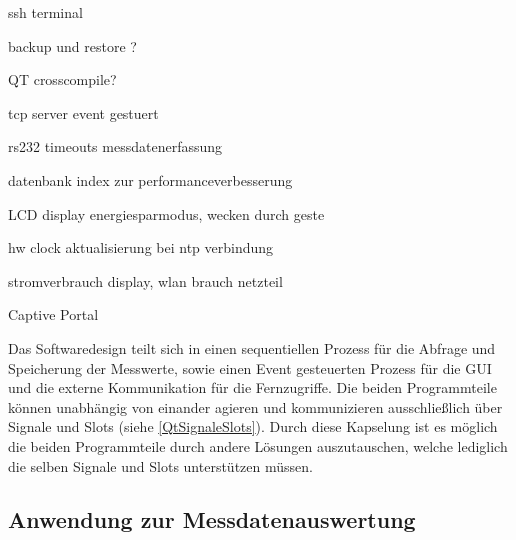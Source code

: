 ssh terminal




backup und restore ?

QT crosscompile?

tcp server event gestuert

rs232 timeouts messdatenerfassung

datenbank index zur performanceverbesserung

LCD display energiesparmodus, wecken durch geste


hw clock aktualisierung bei ntp verbindung


stromverbrauch display, wlan brauch netzteil

Captive Portal

Das Softwaredesign teilt sich in einen sequentiellen Prozess für die Abfrage und Speicherung der Messwerte, sowie einen Event gesteuerten Prozess für die \ac{GUI} und die externe Kommunikation für die Fernzugriffe. 
Die beiden Programmteile können unabhängig von einander agieren und kommunizieren ausschließlich über Signale und Slots (siehe \ref{QtSignaleSlots}). Durch diese Kapselung ist es möglich die beiden Programmteile durch andere Lösungen auszutauschen, welche lediglich die selben Signale und Slots unterstützen müssen.\ 


\subsection{Anwendung zur Messdatenauswertung}